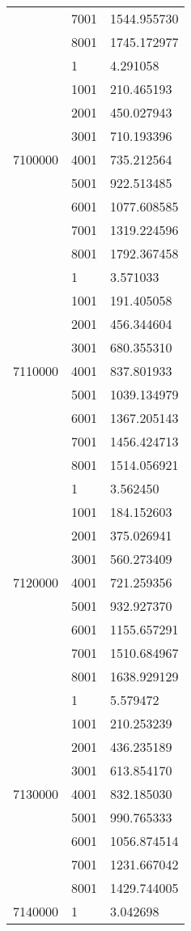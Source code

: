 \begin{table}[htb!]
\begin{tabular}{lll}
 & 7001 & 1544.955730 \\
 & 8001 & 1745.172977 \\
\multirow[c]{9}{*}{7100000} & 1 & 4.291058 \\
 & 1001 & 210.465193 \\
 & 2001 & 450.027943 \\
 & 3001 & 710.193396 \\
 & 4001 & 735.212564 \\
 & 5001 & 922.513485 \\
 & 6001 & 1077.608585 \\
 & 7001 & 1319.224596 \\
 & 8001 & 1792.367458 \\
\multirow[c]{9}{*}{7110000} & 1 & 3.571033 \\
 & 1001 & 191.405058 \\
 & 2001 & 456.344604 \\
 & 3001 & 680.355310 \\
 & 4001 & 837.801933 \\
 & 5001 & 1039.134979 \\
 & 6001 & 1367.205143 \\
 & 7001 & 1456.424713 \\
 & 8001 & 1514.056921 \\
\multirow[c]{9}{*}{7120000} & 1 & 3.562450 \\
 & 1001 & 184.152603 \\
 & 2001 & 375.026941 \\
 & 3001 & 560.273409 \\
 & 4001 & 721.259356 \\
 & 5001 & 932.927370 \\
 & 6001 & 1155.657291 \\
 & 7001 & 1510.684967 \\
 & 8001 & 1638.929129 \\
\multirow[c]{9}{*}{7130000} & 1 & 5.579472 \\
 & 1001 & 210.253239 \\
 & 2001 & 436.235189 \\
 & 3001 & 613.854170 \\
 & 4001 & 832.185030 \\
 & 5001 & 990.765333 \\
 & 6001 & 1056.874514 \\
 & 7001 & 1231.667042 \\
 & 8001 & 1429.744005 \\
\multirow[c]{9}{*}{7140000} & 1 & 3.042698 \\

\end{tabular}
\end{table}
